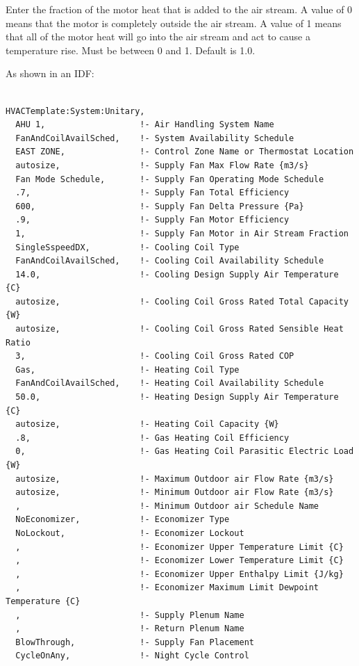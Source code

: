 Enter the fraction of the motor heat that is added to the air stream. A value of 0 means that the motor is completely outside the air stream. A value of 1 means that all of the motor heat will go into the air stream and act to cause a temperature rise. Must be between 0 and 1. Default is 1.0.

As shown in an IDF:

\begin{lstlisting}

HVACTemplate:System:Unitary,
  AHU 1,                   !- Air Handling System Name
  FanAndCoilAvailSched,    !- System Availability Schedule
  EAST ZONE,               !- Control Zone Name or Thermostat Location
  autosize,                !- Supply Fan Max Flow Rate {m3/s}
  Fan Mode Schedule,       !- Supply Fan Operating Mode Schedule
  .7,                      !- Supply Fan Total Efficiency
  600,                     !- Supply Fan Delta Pressure {Pa}
  .9,                      !- Supply Fan Motor Efficiency
  1,                       !- Supply Fan Motor in Air Stream Fraction
  SingleSspeedDX,          !- Cooling Coil Type
  FanAndCoilAvailSched,    !- Cooling Coil Availability Schedule
  14.0,                    !- Cooling Design Supply Air Temperature {C}
  autosize,                !- Cooling Coil Gross Rated Total Capacity {W}
  autosize,                !- Cooling Coil Gross Rated Sensible Heat Ratio
  3,                       !- Cooling Coil Gross Rated COP
  Gas,                     !- Heating Coil Type
  FanAndCoilAvailSched,    !- Heating Coil Availability Schedule
  50.0,                    !- Heating Design Supply Air Temperature {C}
  autosize,                !- Heating Coil Capacity {W}
  .8,                      !- Gas Heating Coil Efficiency
  0,                       !- Gas Heating Coil Parasitic Electric Load {W}
  autosize,                !- Maximum Outdoor air Flow Rate {m3/s}
  autosize,                !- Minimum Outdoor air Flow Rate {m3/s}
  ,                        !- Minimum Outdoor air Schedule Name
  NoEconomizer,            !- Economizer Type
  NoLockout,               !- Economizer Lockout
  ,                        !- Economizer Upper Temperature Limit {C}
  ,                        !- Economizer Lower Temperature Limit {C}
  ,                        !- Economizer Upper Enthalpy Limit {J/kg}
  ,                        !- Economizer Maximum Limit Dewpoint Temperature {C}
  ,                        !- Supply Plenum Name
  ,                        !- Return Plenum Name
  BlowThrough,             !- Supply Fan Placement
  CycleOnAny,              !- Night Cycle Control

\end{lstlisting}
